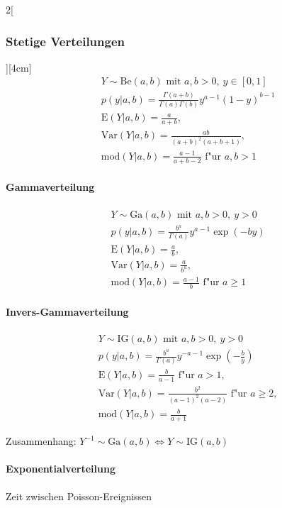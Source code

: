 \documentclass[8pt]{extarticle}
\begin{document}
\begin{multicols}{2}[\subsubsection{Stetige Verteilungen}][4cm]
    \begin{align*}
    & Y \sim \mathrm{Be}(a, b) \text{ mit } a,b > 0,\: y \in \left[0,1\right]\\
    & p(y|a, b) =\frac{\Gamma \left( a+b\right) }{\Gamma (a) \Gamma (b)} y^{a-1} (1-y)^{b-1} \\
    & \mathrm{E}(Y|a, b) = \frac{a}{a+b},\\
    & \mathrm{Var}(Y|a, b) = \frac{ab}{\left(a+b\right)^2(a+b+1)}, \\
    & \mathrm{mod}(Y|a, b) = \frac{a-1}{a+b-2} \text{ f"ur } a,b > 1
  \end{align*}
  
  
  	\paragraph{Gammaverteilung}
  
    \begin{align*}
    & Y \sim \mathrm{Ga}(a, b) \text{ mit } a,b > 0,\: y > 0\\
    & p(y|a, b) = \frac{ b^a }{\Gamma (a)} y^{a-1} \exp (-by) \\
    & \mathrm{E}(Y|a, b) = \frac{a}{b},\\
    & \mathrm{Var}(Y|a, b) = \frac{a}{b^a}, \\
    & \mathrm{mod}(Y|a, b) = \frac{a-1}{b} \text{ f"ur } a \ge 1
  \end{align*}

  	\paragraph{Invers-Gammaverteilung}
  
    \begin{align*}
    & Y \sim \mathrm{IG}(a, b) \text{ mit } a,b > 0,\: y > 0\\
    & p(y|a, b) = \frac{ b^a }{\Gamma (a)} y^{-a-1} \exp (-\frac{b}{y}) \\
    & \mathrm{E}(Y|a, b) = \frac{b}{a-1} \text{ f"ur } a > 1,\\
    & \mathrm{Var}(Y|a, b) = \frac{b^2}{(a-1)^2(a-2)} \text{ f"ur } a \ge 2, \\
    & \mathrm{mod}(Y|a, b) = \frac{b}{a+1}
  \end{align*}
  
\noindent Zusammenhang: $Y^{-1} \sim \mathrm{Ga}(a, b) \Leftrightarrow Y \sim \mathrm{IG}(a, b)$
  
  
  	\paragraph{Exponentialverteilung} Zeit zwischen Poisson-Ereignissen
  

\end{multicols}
\end{document}
